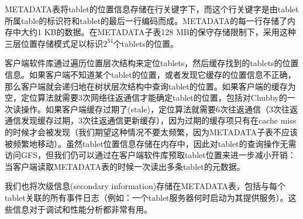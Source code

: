 \documentclass{article}
\begin{document}
\par
METADATA表将tablet的位置信息存储在行关键字下，而这个行关键字是由tablet所属table的标识符和tablet的最后一行编码而成。METADATA的每一行存储了内存中大约1 KB的数据。在METADATA子表128 MB的保守存储限制下，采用这种三层位置存储模式足以标识$2^{34}$个tablets的位置。\par
客户端软件库通过遍历位置层次结构来定位tablets，然后缓存找到的tablets的位置信息。如果客户端不知道某个tablet的位置，或者发现它缓存的位置信息不正确，那么客户端就会递归地在树状层次结构中查询tablet的位置。如果客户端的缓存为空，定位算法就需要3次网络往返通信才能确定tablet的位置，包括对Chubby的一次读操作。如果客户端缓存过期了(stale)，定位算法就需要6次往返通信（3次往返通信发现缓存过期，3次往返通信更新缓存），因为过期的缓存项只有在cache miss的时候才会被发现（我们期望这种情况不要太频繁，因为METADATA子表不应该被频繁地移动）。虽然tablet位置信息存储在内存中，因此对tablet的查询操作无需访问GFS，但我们仍可以通过在客户端软件库预取tablet位置来进一步减小开销：当客户端读取METADATA表的时候一次读出多条tablet的元数据。\par
我们也将次级信息(secondary information)存储在METADATA表，包括与每个tablet关联的所有事件日志（例如：一个tablet服务器何时启动为其提供服务）。这些信息对于调试和性能分析都非常有用。
\end{document}
